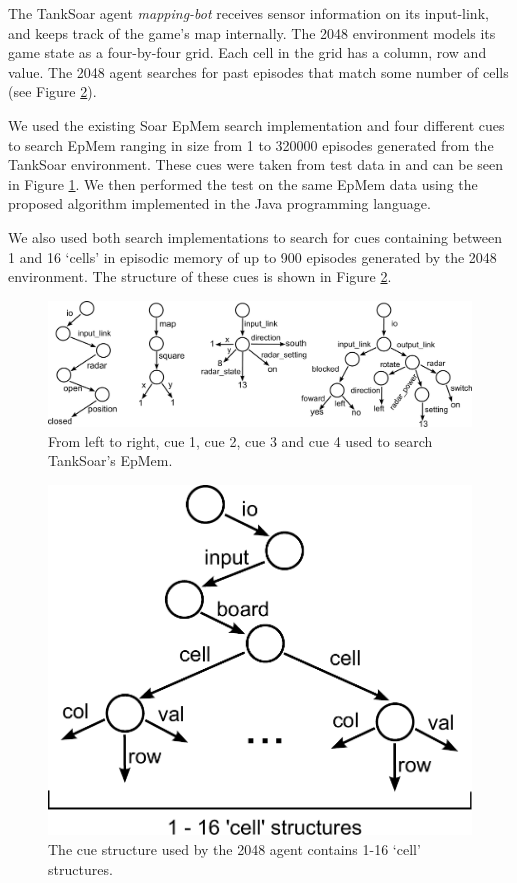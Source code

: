 \documentclass[envcountsame]{llncs}
\begin{document}
  The TankSoar agent \emph{mapping-bot} receives sensor information on its input-link, and keeps track of the game's map internally.
  The 2048 environment models its game state as a four-by-four grid. Each cell in the grid has a column, row and value.
  The 2048 agent searches for past episodes that match some number of cells (see Figure \ref{fig:tfe_cues}).
  
  We used the existing Soar EpMem search implementation and four different cues to search EpMem ranging in size from 1 to 320000 episodes generated from the TankSoar environment.
  These cues were taken from test data in \cite{derbinsky2012effective} and can be seen in Figure \ref{fig:tanksoar_cues}.
  We then performed the test on the same EpMem data using the proposed algorithm implemented in the Java programming language.

  We also used both search implementations to search for cues containing between 1 and 16 `cells' in episodic memory of up to 900 episodes generated by the 2048 environment.
  The structure of these cues is shown in Figure \ref{fig:tfe_cues}.
  
  \begin{figure}
  \centering
  \includegraphics[scale=0.3]{graphics/tanksoar_cues.pdf}
  \caption{From left to right, cue 1, cue 2, cue 3 and cue 4 used to search TankSoar's EpMem.}
  \label{fig:tanksoar_cues}
  \end{figure}
  
  \begin{figure}
  \centering
  \includegraphics[scale=0.3]{graphics/tfe_cues.pdf}
  \caption{The cue structure used by the 2048 agent contains 1-16 `cell' structures.}
  \label{fig:tfe_cues}
  \end{figure}
  
\end{document}
